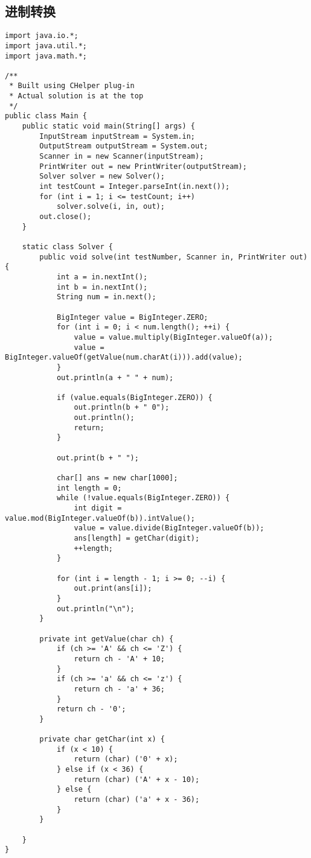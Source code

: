 \documentclass[twoside]{article}
\begin{document}
\subsection{进制转换}
\begin{lstlisting}
import java.io.*;
import java.util.*;
import java.math.*;

/**
 * Built using CHelper plug-in
 * Actual solution is at the top
 */
public class Main {
    public static void main(String[] args) {
        InputStream inputStream = System.in;
        OutputStream outputStream = System.out;
        Scanner in = new Scanner(inputStream);
        PrintWriter out = new PrintWriter(outputStream);
        Solver solver = new Solver();
        int testCount = Integer.parseInt(in.next());
        for (int i = 1; i <= testCount; i++)
            solver.solve(i, in, out);
        out.close();
    }

    static class Solver {
        public void solve(int testNumber, Scanner in, PrintWriter out) {
            int a = in.nextInt();
            int b = in.nextInt();
            String num = in.next();

            BigInteger value = BigInteger.ZERO;
            for (int i = 0; i < num.length(); ++i) {
                value = value.multiply(BigInteger.valueOf(a));
                value = BigInteger.valueOf(getValue(num.charAt(i))).add(value);
            }
            out.println(a + " " + num);

            if (value.equals(BigInteger.ZERO)) {
                out.println(b + " 0");
                out.println();
                return;
            }

            out.print(b + " ");

            char[] ans = new char[1000];
            int length = 0;
            while (!value.equals(BigInteger.ZERO)) {
                int digit = value.mod(BigInteger.valueOf(b)).intValue();
                value = value.divide(BigInteger.valueOf(b));
                ans[length] = getChar(digit);
                ++length;
            }

            for (int i = length - 1; i >= 0; --i) {
                out.print(ans[i]);
            }
            out.println("\n");
        }

        private int getValue(char ch) {
            if (ch >= 'A' && ch <= 'Z') {
                return ch - 'A' + 10;
            }
            if (ch >= 'a' && ch <= 'z') {
                return ch - 'a' + 36;
            }
            return ch - '0';
        }

        private char getChar(int x) {
            if (x < 10) {
                return (char) ('0' + x);
            } else if (x < 36) {
                return (char) ('A' + x - 10);
            } else {
                return (char) ('a' + x - 36);
            }
        }

    }
}

\end{lstlisting}
\end{document}
